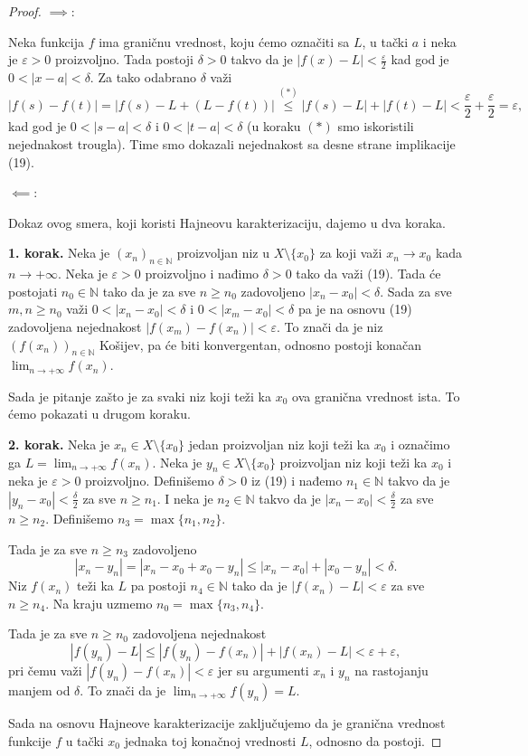 \documentclass[a4paper,12pt]{article}
\theoremstyle{plain}
\theoremstyle{definition}
\theoremstyle{remark}
\begin{document}
\begin{proof}
$\implies:$ 

Neka funkcija $f$ ima graničnu vrednost, koju ćemo označiti sa $L$, u tački $a$ i neka je $\varepsilon > 0$ proizvoljno. Tada postoji $\delta > 0$ takvo da je $|f(x) - L| < \frac{\varepsilon}{2}$ kad god je $0 < |x - a| < \delta$. Za tako odabrano $\delta$ važi
$$ |f(s) - f(t)| = |f(s) - L + (L - f(t))| \overset{(*)}{\le} |f(s) - L| + |f(t) - L| < \frac{\varepsilon}{2} + \frac{\varepsilon}{2} = \varepsilon, $$
kad god je $0 < |s - a| < \delta$ i $0 < |t - a| < \delta$ (u koraku $(*)$ smo iskoristili nejednakost trougla). Time smo dokazali nejednakost sa desne strane implikacije (19).

$\impliedby:$

Dokaz ovog smera, koji koristi Hajneovu karakterizaciju, dajemo u dva koraka.

\textbf{1. korak.} Neka je $(x_n)_{n \in \mathbb{N}}$ proizvoljan niz u $X \setminus \{x_0\}$ za koji važi $x_n \to x_0$ kada $n \to +\infty$. Neka je $\varepsilon > 0$ proizvoljno i nađimo $\delta > 0$ tako da važi (19). Tada će postojati $n_0 \in \mathbb{N}$ tako da je za sve $n \ge n_0$ zadovoljeno $|x_n - x_0| < \delta$. Sada za sve $m, n \ge n_0$ važi $0 < |x_n - x_0| < \delta$ i $0 < |x_m - x_0| < \delta$ pa je na osnovu (19) zadovoljena nejednakost $|f(x_m) - f(x_n)| < \varepsilon$. To znači da je niz $(f(x_n))_{n \in \mathbb{N}}$ Košijev, pa će biti konvergentan, odnosno postoji konačan $\lim_{n \to +\infty} f(x_n)$.

Sada je pitanje zašto je za svaki niz koji teži ka $x_0$ ova granična vrednost ista. To ćemo pokazati u drugom koraku.

\textbf{2. korak.} Neka je $x_n \in X \setminus \{x_0\}$ jedan proizvoljan niz koji teži ka $x_0$ i označimo ga $L = \lim_{n \to +\infty} f(x_n)$. Neka je $y_n \in X \setminus \{x_0\}$ proizvoljan niz koji teži ka $x_0$ i neka je $\varepsilon > 0$ proizvoljno. Definišemo $\delta > 0$ iz (19) i nađemo $n_1 \in \mathbb{N}$ takvo da je $|y_n - x_0| < \frac{\delta}{2}$ za sve $n \ge n_1$. I neka je $n_2 \in \mathbb{N}$ takvo da je $|x_n - x_0| < \frac{\delta}{2}$ za sve $n \ge n_2$. Definišemo $n_3 = \max\{n_1, n_2\}$.

Tada je za sve $n \ge n_3$ zadovoljeno
$$ |x_n - y_n| = |x_n - x_0 + x_0 - y_n| \le |x_n - x_0| + |x_0 - y_n| < \delta. $$
Niz $f(x_n)$ teži ka $L$ pa postoji $n_4 \in \mathbb{N}$ tako da je $|f(x_n) - L| < \varepsilon$ za sve $n \ge n_4$. Na kraju uzmemo $n_0 = \max\{n_3, n_4\}$.

Tada je za sve $n \ge n_0$ zadovoljena nejednakost
$$ |f(y_n) - L| \le |f(y_n) - f(x_n)| + |f(x_n) - L| < \varepsilon + \varepsilon, $$
pri čemu važi $|f(y_n) - f(x_n)| < \varepsilon$ jer su argumenti $x_n$ i $y_n$ na rastojanju manjem od $\delta$. To znači da je $\lim_{n \to +\infty} f(y_n) = L$.

Sada na osnovu Hajneove karakterizacije zaključujemo da je granična vrednost funkcije $f$ u tački $x_0$ jednaka toj konačnoj vrednosti $L$, odnosno da postoji.
\end{proof}
\end{document}
